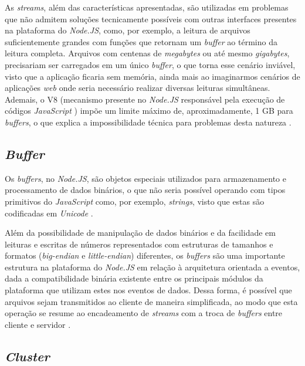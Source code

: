 \documentclass[12pt]{article}
\begin{document}
As \textit{streams}, além das características apresentadas, são utilizadas em problemas que não admitem soluções tecnicamente
possíveis com outras interfaces presentes na plataforma do \textit{Node.JS}, como, por exemplo, a leitura de 
arquivos suficientemente grandes com funções que retornam um \textit{buffer} ao término da leitura completa. Arquivos com 
centenas de \textit{megabytes} ou até mesmo \textit{gigabytes}, precisariam ser carregados em um único 
\textit{buffer}, o que torna esse cenário inviável, visto que a aplicação ficaria sem memória, ainda mais ao 
imaginarmos cenários de aplicações \textit{web} onde seria necessário realizar diversas leituras simultâneas.
Ademais, o V8 (mecanismo presente no \textit{Node.JS} responsável pela execução de códigos \textit{JavaScript} \cite{NODEV8}) impõe 
um limite máximo de, aproximadamente, 1 GB para \textit{buffers}, o que explica a impossibilidade técnica para problemas 
desta natureza \cite[p. 122]{MARIO}.

\subsection{\textit{Buffer}}

Os \textit{buffers}, no \textit{Node.JS}, são objetos especiais utilizados para armazenamento e processamento 
de dados binários, o que não seria possível operando com tipos primitivos do \textit{JavaScript} como, por exemplo,
\textit{strings}, visto que estas são codificadas em \textit{Unicode} \cite[p. 29]{DIOGORESENDE}.

Além da possibilidade de manipulação de dados binários e da facilidade em leituras e escritas de números representados
com estruturas de tamanhos e formatos (\textit{big-endian} e \textit{little-endian}) diferentes, os \textit{buffers} são uma importante estrutura na plataforma do \textit{Node.JS} em relação à arquitetura
orientada a eventos, dada a compatibilidade binária existente entre os principais módulos da plataforma que 
utilizam estes nos eventos de dados. Dessa forma, é possível que arquivos sejam transmitidos ao cliente de maneira 
simplificada, ao modo que esta operação se resume ao encadeamento de \textit{streams} com a troca de 
\textit{buffers} entre cliente e servidor \cite[p. 29]{DIOGORESENDE}.


\subsection{\textit{Cluster}}
\end{document}
